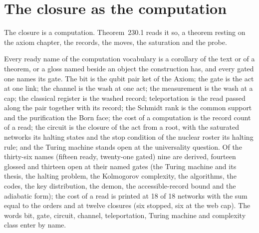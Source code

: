 \section{The closure as the computation}\label{mod:XIII-1-closure-as-the-computation}
\label{narr:open:13-1}The closure is a computation. Theorem~230.1 reads it so, a theorem resting on the axiom chapter, the records, the moves, the saturation and the probe.
\begin{chtheorem}\label{box:XIII-1-closure-as-the-computation:1}
Every ready name of the computation vocabulary is a corollary of the text or of a theorem, or a gloss named beside an object the construction has, and every gated one names its gate. The bit is the qubit pair ket of the Axiom; the gate is the act at one link; the channel is the wash at one act; the measurement is the wash at a cap; the classical register is the washed record; teleportation is the read passed along the pair together with its record; the Schmidt rank is the common support and the purification the Born face; the cost of a computation is the record count of a read; the circuit is the closure of the act from a root, with the saturated networks its halting states and the stop condition of the nuclear roster its halting rule; and the Turing machine stands open at the universality question. Of the thirty-six names (fifteen ready, twenty-one gated) nine are derived, fourteen glossed and thirteen open at their named gates (the Turing machine and its thesis, the halting problem, the Kolmogorov complexity, the algorithms, the codes, the key distribution, the demon, the accessible-record bound and the adiabatic form); the cost of a read is printed at 18 of 18 networks with the sum equal to the orders and at twelve closures (six stopped, six at the web cap). The words bit, gate, circuit, channel, teleportation, Turing machine and complexity class enter by name.
\end{chtheorem}
